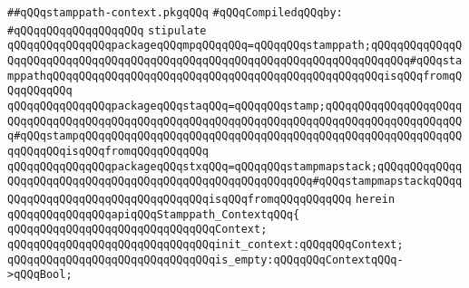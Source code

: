 \label{src/lib/compiler/front/typer-stuff/modules/stamppath-context.pkg}
\verb|##qQQqstamppath-context.pkgqQQq|\newline
\newline
\verb|#qQQqCompiledqQQqby:|\newline
\verb|#qQQqqQQqqQQqqQQqqQQq|\newline
\newline
\newline
\newline
\verb|stipulate|\newline
\verb|qQQqqQQqqQQqqQQqpackageqQQqmpqQQqqQQq=qQQqqQQqstamppath;qQQqqQQqqQQqqQQqqQQqqQQqqQQqqQQqqQQqqQQqqQQqqQQqqQQqqQQqqQQqqQQqqQQqqQQqqQQq#qQQqstamppathqQQqqQQqqQQqqQQqqQQqqQQqqQQqqQQqqQQqqQQqqQQqqQQqqQQqisqQQqfromqQQqqQQqqQQq|\newline
\verb|qQQqqQQqqQQqqQQqpackageqQQqstaqQQq=qQQqqQQqstamp;qQQqqQQqqQQqqQQqqQQqqQQqqQQqqQQqqQQqqQQqqQQqqQQqqQQqqQQqqQQqqQQqqQQqqQQqqQQqqQQqqQQqqQQqqQQq#qQQqstampqQQqqQQqqQQqqQQqqQQqqQQqqQQqqQQqqQQqqQQqqQQqqQQqqQQqqQQqqQQqqQQqqQQqisqQQqfromqQQqqQQqqQQq|\newline
\verb|qQQqqQQqqQQqqQQqpackageqQQqstxqQQq=qQQqqQQqstampmapstack;qQQqqQQqqQQqqQQqqQQqqQQqqQQqqQQqqQQqqQQqqQQqqQQqqQQqqQQqqQQq#qQQqstampmapstackqQQqqQQqqQQqqQQqqQQqqQQqqQQqqQQqqQQqisqQQqfromqQQqqQQqqQQq|\newline
\verb|herein|\newline
\newline
\verb|qQQqqQQqqQQqqQQqapiqQQqStamppath_ContextqQQq{|\newline
\newline
\verb|qQQqqQQqqQQqqQQqqQQqqQQqqQQqqQQqContext;|\newline
\newline
\verb|qQQqqQQqqQQqqQQqqQQqqQQqqQQqqQQqinit_context:qQQqqQQqContext;|\newline
\newline
\verb|qQQqqQQqqQQqqQQqqQQqqQQqqQQqqQQqis_empty:qQQqqQQqContextqQQq->qQQqBool;|\newline
